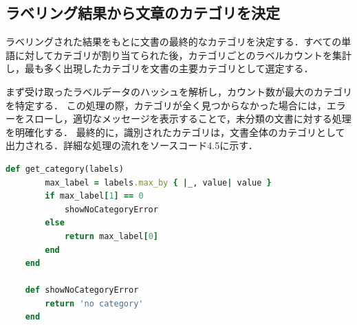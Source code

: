 \clearpage

\subsection{ラベリング結果から文章のカテゴリを決定}
\label{subsec:app_classify}

ラベリングされた結果をもとに文書の最終的なカテゴリを決定する．すべての単語に対してカテゴリが割り当てられた後，カテゴリごとのラベルカウントを集計し，最も多く出現したカテゴリを文書の主要カテゴリとして選定する．

まず受け取ったラベルデータのハッシュを解析し，カウント数が最大のカテゴリを特定する．
この処理の際，カテゴリが全く見つからなかった場合には，エラーをスローし，適切なメッセージを表示することで，未分類の文書に対する処理を明確化する．
最終的に，識別されたカテゴリは，文書全体のカテゴリとして出力される．詳細な処理の流れをソースコード4.5に示す．

\begin{lstlisting}[language=Ruby, caption=文書のカテゴリを決定するメソッド]
    def get_category(labels)
        max_label = labels.max_by { |_, value| value }
        if max_label[1] == 0
            showNoCategoryError
        else
            return max_label[0]
        end
    end

    def showNoCategoryError
        return 'no category'
    end
\end{lstlisting}

